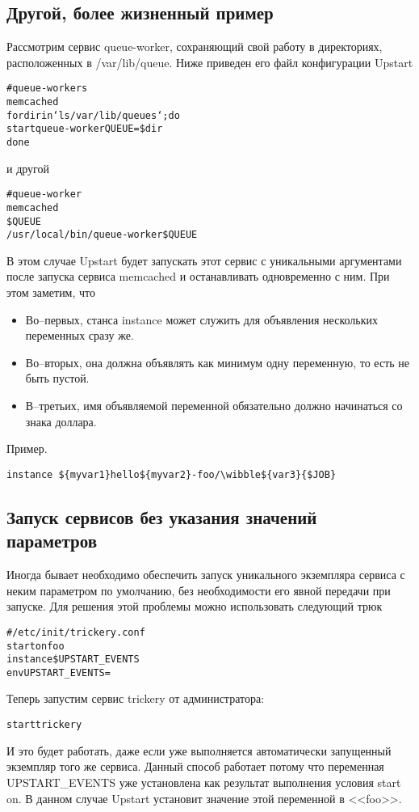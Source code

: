 \subsection*{Другой, более жизненный пример}
Рассмотрим сервис queue-worker, сохраняющий свой работу в директориях, расположенных в /var/lib/queue. Ниже приведен его файл конфигурации Upstart \begin{alltt}
# queue-workers
 memcached
for dir in `ls /var/lib/queues` ; do
start queue-worker QUEUE=\$dir
done
\end{alltt} и другой \begin{alltt}
# queue-worker
 memcached
 \$QUEUE
 /usr/local/bin/queue-worker \$QUEUE
\end{alltt}
В этом случае Upstart будет запускать этот сервис с уникальными аргументами после запуска сервиса memcached и останавливать одновременно с ним. При этом заметим, что \begin{itemize}
\item Во--первых, станса instance может служить для объявления нескольких переменных сразу же.
\item Во--вторых, она должна объявлять как минимум одну переменную, то есть не быть пустой.
\item В--третьих, имя объявляемой переменной обязательно должно начинаться со знака доллара.
\end{itemize}
Пример. \begin{verbatim}
instance ${myvar1}hello${myvar2}-foo/\wibble${var3}{$JOB}
\end{verbatim}
\subsection{Запуск сервисов без указания значений параметров}
Иногда бывает необходимо обеспечить запуск уникального экземпляра сервиса с неким параметром по умолчанию, без необходимости его явной передачи при запуске. Для решения этой проблемы можно использовать следующий трюк 
\begin{alltt}
# /etc/init/trickery.conf
start on foo
instance \$UPSTART_EVENTS
env UPSTART_EVENTS=
\end{alltt} Теперь запустим сервис trickery от администратора: 
\begin{alltt}
start trickery
\end{alltt} 
И это будет работать, даже если уже выполняется автоматически запущенный экземпляр того же сервиса. Данный способ работает потому что переменная UPSTART\_EVENTS уже установлена как результат выполнения условия start on. В данном случае Upstart установит значение этой переменной в <<foo>>. 

